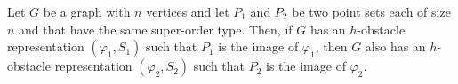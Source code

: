 \documentclass{patmorin}
\begin{document}
\begin{lem}
  Let $G$ be a graph with $n$ vertices and let $P_1$ and $P_2$ be two
  point sets each of size $n$ and that have the same super-order type.
  Then, if $G$ has an $h$-obstacle representation $(\varphi_1,S_1)$
  such that $P_1$ is the image of $\varphi_1$, then $G$ also has an
  $h$-obstacle representation $(\varphi_2,S_2)$ such that $P_2$ is the
  image of $\varphi_2$.
\end{lem}


%
%
%
%
\end{document}
